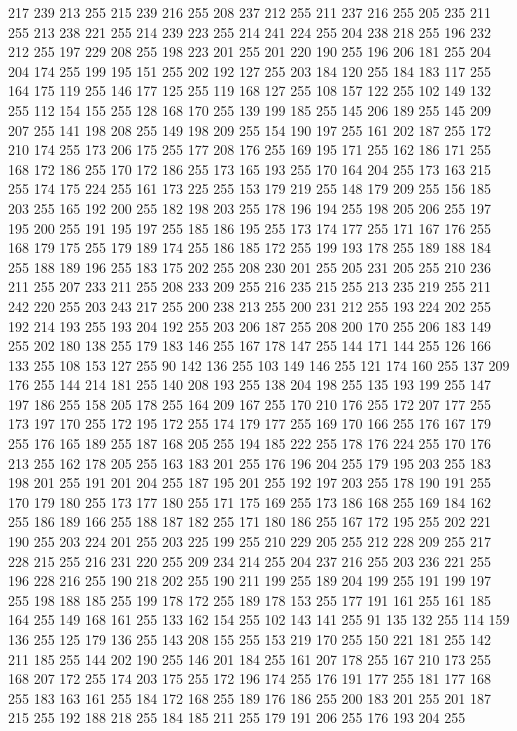 217 239 213 255 215 239 216 255 208 237 212 255 211 237 216 255 205 235 211 255 213 238 221 255 214 239 223 255 214 241 224 255 204 238 218 255 196 232 212 255 197 229 208 255 198 223 201 255 201 220 190 255 196 206 181 255 204 204 174 255 199 195 151 255
202 192 127 255 203 184 120 255 184 183 117 255 164 175 119 255 146 177 125 255 119 168 127 255 108 157 122 255 102 149 132 255 112 154 155 255 128 168 170 255 139 199 185 255 145 206 189 255 145 209 207 255 141 198 208 255 149 198 209 255 154 190 197 255
161 202 187 255 172 210 174 255 173 206 175 255 177 208 176 255 169 195 171 255 162 186 171 255 168 172 186 255 170 172 186 255 173 165 193 255 170 164 204 255 173 163 215 255 174 175 224 255 161 173 225 255 153 179 219 255 148 179 209 255 156 185 203 255
165 192 200 255 182 198 203 255 178 196 194 255 198 205 206 255 197 195 200 255 191 195 197 255 185 186 195 255 173 174 177 255 171 167 176 255 168 179 175 255 179 189 174 255 186 185 172 255 199 193 178 255 189 188 184 255 188 189 196 255 183 175 202 255
208 230 201 255 205 231 205 255 210 236 211 255 207 233 211 255 208 233 209 255 216 235 215 255 213 235 219 255 211 242 220 255 203 243 217 255 200 238 213 255 200 231 212 255 193 224 202 255 192 214 193 255 193 204 192 255 203 206 187 255 208 200 170 255
206 183 149 255 202 180 138 255 179 183 146 255 167 178 147 255 144 171 144 255 126 166 133 255 108 153 127 255 90 142 136 255 103 149 146 255 121 174 160 255 137 209 176 255 144 214 181 255 140 208 193 255 138 204 198 255 135 193 199 255 147 197 186 255
158 205 178 255 164 209 167 255 170 210 176 255 172 207 177 255 173 197 170 255 172 195 172 255 174 179 177 255 169 170 166 255 176 167 179 255 176 165 189 255 187 168 205 255 194 185 222 255 178 176 224 255 170 176 213 255 162 178 205 255 163 183 201 255
176 196 204 255 179 195 203 255 183 198 201 255 191 201 204 255 187 195 201 255 192 197 203 255 178 190 191 255 170 179 180 255 173 177 180 255 171 175 169 255 173 186 168 255 169 184 162 255 186 189 166 255 188 187 182 255 171 180 186 255 167 172 195 255
202 221 190 255 203 224 201 255 203 225 199 255 210 229 205 255 212 228 209 255 217 228 215 255 216 231 220 255 209 234 214 255 204 237 216 255 203 236 221 255 196 228 216 255 190 218 202 255 190 211 199 255 189 204 199 255 191 199 197 255 198 188 185 255
199 178 172 255 189 178 153 255 177 191 161 255 161 185 164 255 149 168 161 255 133 162 154 255 102 143 141 255 91 135 132 255 114 159 136 255 125 179 136 255 143 208 155 255 153 219 170 255 150 221 181 255 142 211 185 255 144 202 190 255 146 201 184 255
161 207 178 255 167 210 173 255 168 207 172 255 174 203 175 255 172 196 174 255 176 191 177 255 181 177 168 255 183 163 161 255 184 172 168 255 189 176 186 255 200 183 201 255 201 187 215 255 192 188 218 255 184 185 211 255 179 191 206 255 176 193 204 255
